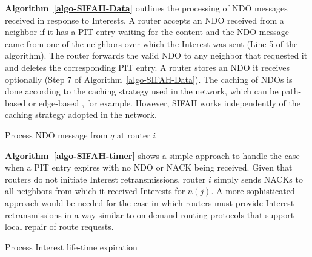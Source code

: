 \documentclass{ancs15-alternate}
\begin{document}
{\bf Algorithm~\ref{algo-SIFAH-Data}} outlines the processing of NDO messages received in response to Interests.  A router accepts an NDO received from a neighbor if it has a PIT entry waiting for the content and the NDO message came from one of the neighbors over which the Interest was sent (Line 5 of the algorithm). 
The router   forwards the valid NDO to any neighbor that requested it and deletes the corresponding PIT entry. 
A router stores an NDO it receives optionally (Step 7 of Algorithm~\ref{algo-SIFAH-Data}).
The caching  of NDOs is done according to the   caching strategy used in the network, which can be path-based or edge-based \cite{caching}, for example. However, SIFAH works independently of the caching strategy adopted in the network.



\begin{algorithm}[h]
\caption{Process NDO message from $q$ at router $i$}
\label{algo-SIFAH-Data}
{\fontsize{8}{8}\selectfont
\begin{algorithmic}[1]

  \ELSE

\ENDIF
{}
\end{algorithmic}}       
\end{algorithm}


{\bf  Algorithm~\ref{algo-SIFAH-timer}} shows a simple approach to handle  the case when a PIT entry expires with no NDO or NACK being received.  
Given that routers do not initiate Interest retransmissions, router $i$ simply sends NACKs to all  neighbors from which it received Interests for $n(j)$. 
A more sophisticated approach would be needed for the case  in which routers must provide Interest retransmissions in a way similar to on-demand routing protocols that support local repair of route requests. 

\begin{algorithm}[h]
\caption{Process Interest life-time expiration }
\label{algo-SIFAH-timer}
{\fontsize{8}{8}\selectfont
\begin{algorithmic}[1]

     
\end{algorithmic}}
\end{algorithm}
\end{document}
